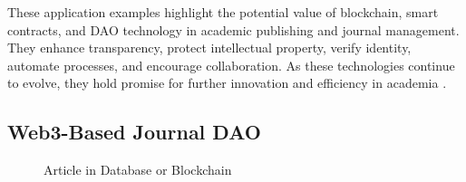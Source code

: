 \documentclass[lettersize,journal]{IEEEtran}
\begin{document}
These application examples highlight the potential value of blockchain, smart contracts, and DAO technology in academic publishing and journal management. They enhance transparency, protect intellectual property, verify identity, automate processes, and encourage collaboration. As these technologies continue to evolve, they hold promise for further innovation and efficiency in academia \cite{vacca2021systematic}.

\subsection{Web3-Based Journal DAO}

\begin{figure}[!ht]
  \centering
  \hfil
  \caption{Article in Database or Blockchain}
  \label{fig:storage}
\end{figure}
\end{document}
